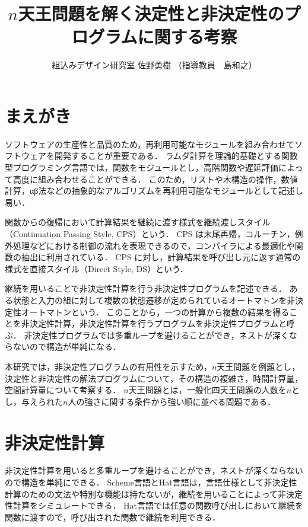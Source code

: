 \documentclass[10pt,a4j,twocolumn,oneside]{jsarticle}
\title{
  {\bf $n$天王問題を解く決定性と非決定性のプログラムに関する考察}
}
\author{組込みデザイン研究室  佐野勇樹 \quad （指導教員　島和之）}
\date{}
\begin{document}
\maketitle
\thispagestyle{empty}

\section{まえがき}

ソフトウェアの生産性と品質のため，再利用可能なモジュールを組み合わせてソフトウェアを開発することが重要である．
ラムダ計算を理論的基礎とする関数型プログラミング言語では，関数をモジュールとし，高階関数や遅延評価によって高度に組み合わせることができる．
このため，リストや木構造の操作，数値計算，αβ法などの抽象的なアルゴリズムを再利用可能なモジュールとして記述し易い\cite{Hughes1989}．

関数からの復帰において計算結果を継続に渡す様式を継続渡しスタイル（Continuation Passing Style, CPS）という\cite{Sussman1998,Reynolds1993}．
CPS は末尾再帰，コルーチン，例外処理などにおける制御の流れを表現できるので，コンパイラによる最適化や関数の抽出に利用されている\cite{Sumii2004,Hirota2013,Steele1978,Haynes1984}．
CPS に対し，計算結果を呼び出し元に返す通常の様式を直接スタイル（Direct Style, DS）という．

継続を用いることで非決定性計算を行う非決定性プログラムを記述できる．
ある状態と入力の組に対して複数の状態遷移が定められているオートマトンを非決定性オートマトンという\cite{Fujiwara2015}．
このことから，一つの計算から複数の結果を得ることを非決定性計算，非決定性計算を行うプログラムを非決定性プログラムと呼ぶ．
非決定性プログラムでは多重ループを避けることができ，ネストが深くならないので構造が単純になる．

本研究では，非決定性プログラムの有用性を示すため，$n$天王問題を例題とし，決定性と非決定性の解法プログラムについて，その構造の複雑さ，時間計算量，空間計算量について考察する．
$n$天王問題とは，一般化四天王問題\cite{Yokomoto201910}の人数を$n$とし，与えられた$n$人の強さに関する条件から強い順に並べる問題である．

\section{非決定性計算}

非決定性計算を用いると多重ループを避けることができ，ネストが深くならないので構造を単純にできる．
Scheme言語とHat言語は，言語仕様として非決定性計算のための文法や特別な機能は持たないが，継続を用いることによって非決定性計算をシミュレートできる．
Hat言語では任意の関数呼び出しにおいて継続を関数に渡すので，呼び出された関数で継続を利用できる．
\end{document}
